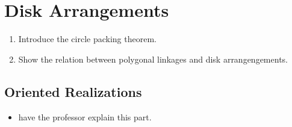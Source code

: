 \section{Disk Arrangements}
\begin{enumerate}%
\item Introduce the circle packing theorem.
\item Show the relation between polygonal linkages and disk arrangengements.
\end{enumerate} 
\subsection{Oriented Realizations}
\begin{itemize}
\item[\rn{1}]have the professor explain this part.
\end{itemize}  
